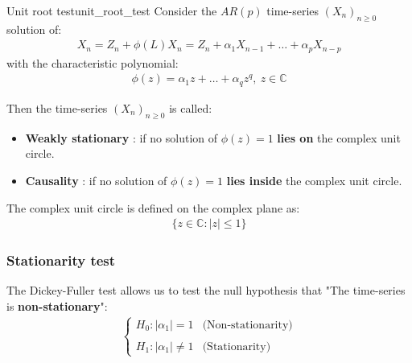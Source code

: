 \begin{theorem}{Unit root test}{unit_root_test}
    Consider the $AR(p)$ time-series $(X_n)_{n\ge0}$ solution of:
    \begin{align*}
        X_n = Z_n + \phi(L)X_n = Z_n + \alpha_1X_{n-1} + \dots + \alpha_pX_{n-p}
    \end{align*}
    \noindent with the characteristic polynomial:
    \begin{align*}
        \phi(z) = \alpha_1z + \dots + \alpha_qz^q, \ z \in \mathbb{C}
    \end{align*}

    \noindent Then the time-series $(X_n)_{n\ge0}$ is called:
    \begin{itemize}
        \item \textbf{Weakly stationary} : if no solution of $\phi(z) = 1$ \textbf{lies on} the complex unit circle.
        \item \textbf{Causality} : if no solution of $\phi(z) = 1$ \textbf{lies inside} the complex unit circle.
    \end{itemize}

    \noindent The complex unit circle is defined on the complex plane as:
    \begin{align*}
        \{ z \in \mathbb{C} : |z| \le 1 \}
    \end{align*}
\end{theorem}

\subsubsection{Stationarity test}
\begin{definition}
    The Dickey-Fuller test allows us to test the null hypothesis that "The time-series is \textbf{non-stationary}":
    \begin{align*}
        \begin{cases}
            H_0:|\alpha_1|=1 &\text{(Non-stationarity)}
            \\ \\
            H_1:|\alpha_1|\ne 1 &\text{(Stationarity)}
        \end{cases}
    \end{align*}
\end{definition}
